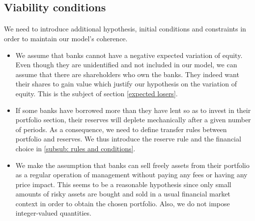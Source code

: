 \documentclass{article}
\begin{document}
\subsection{Viability conditions}\label{ConstraintsInitialConditions}

\paragraph{}
We need to introduce additional hypothesis, initial conditions and constraints in order to maintain our model's coherence. 

\begin{itemize}

\item We assume that banks cannot have a negative expected variation of equity. Even though they are unidentified and not included in our model, we can assume that there are shareholders who own the banks. They indeed want their shares to gain value which justify our hypothesis on the variation of equity. This is the subject of section \ref{expected losers}.
 
\item If some banks have borrowed more than they have lent so as to invest in their portfolio section, their reserves will deplete mechanically after a given number of periods. As a consequence, we need to define transfer rules between portfolio and reserves. We thus introduce the reserve rule and the financial choice in \ref{subsub: rules and conditions}.

\item We make the assumption that banks can sell freely assets from their portfolio as a regular operation of management without paying any fees or having any price impact. This seems to be a reasonable hypothesis since only small amounts of risky assets are bought and sold in a usual financial market context in order to obtain the chosen portfolio. Also, we do not impose integer-valued quantities. 


\end{itemize}


\end{document}
